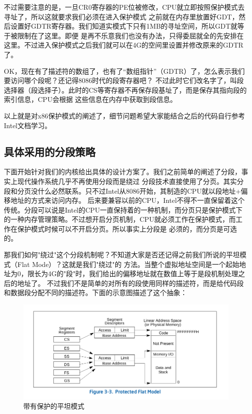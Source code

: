 \par 不过需要注意的是，一旦CR0寄存器的PE位被修改，CPU就立即按照保护模式去寻址了，所以这就要求我们必须在进入保护模式\allowbreak
之前就在内存里放置好GDT，然后设置好GDTR寄存器。我们知道实模式下只有1MB的寻址空间，所以GDT就等于被限制在了这里。即便\allowbreak
是再不乐意我们也没有办法，只得委屈就全的先安排在这里。不过进入保护模式之后我们就可以在4G的空间里设置并修改原来的GDTR了。

\par OK，现在有了描述符的数组了，也有了“数组指针”（GDTR）了，怎么表示我们要访问哪个段呢？还记得8086时代的段寄存器吧？\allowbreak
不过此时它们改名字了，叫段选择器（段选择子）。此时的CS等寄存器不再保存段基址了，而是保存其指向段的索引信息，CPU会根据\allowbreak
这些信息在内存中获取到段信息。

\par 以上就是对x86保护模式的阐述了，细节问题希望大家能结合之后的代码自行参考Intel文档学习。

\subsection{具体采用的分段策略}

\par 下面开始针对我们的内核给出具体的设计方案了。我们之前简单的阐述了分段，事实上现代操作系统几乎不再使用分段而是绕过\allowbreak
分段技术直接使用了分页。其实分段和分页没什么必然联系。只不过Intel从8086开始，其制造的CPU就以段地址+偏移地址的方式来访问内存。\allowbreak
后来要兼容以前的CPU，Intel不得不一直保留着这个传统。分段可以说是Intel的CPU一直保持着的一种机制，而分页只是保护模式下\allowbreak
的一种内存管理策略。不过想开启分页机制，CPU就必须工作在保护模式，而工作在保护模式时候可以不开启分页。所以事实上分段是\allowbreak
必须的，而分页是可选的。

\par 那我们如何"绕过"这个分段机制呢？不知道大家是否还记得之前我们所说的平坦模式（Flat Mode）？这就是我们"绕过"的\allowbreak
方法。当整个虚拟地址空间是一个起始地址为0，限长为4G的"段"时，我们给出的偏移地址就在数值上等于是段机制处理之后的地址了。
不过我们不是简单的对所有的段使用同样的描述符，而是给代码段和数据段分配不同的描述符。下面的示意图描述了这个抽象：

\begin{figure}[ht]
      \centering
      \includegraphics[scale=0.5]{picture/chapt6/protected_flat_mode.png}
      \caption{带有保护的平坦模式}
\end{figure}

